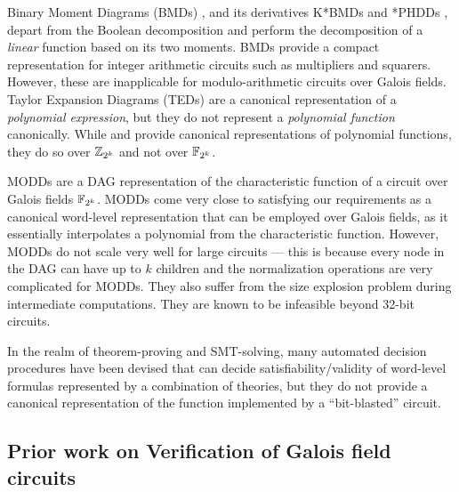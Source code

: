 Binary Moment Diagrams (BMDs) \cite{bmd}, and its derivatives K*BMDs
\cite{kbmd} and *PHDDs \cite{phdd}, depart from the Boolean
decomposition and perform the decomposition of a {\it linear} function
based on its two moments. BMDs provide a compact representation for
integer arithmetic circuits such as multipliers and squarers. However,
these are inapplicable for modulo-arithmetic circuits over Galois fields.
Taylor Expansion Diagrams (TEDs) \cite{ted_tcomp} are a
canonical representation of a {\it polynomial expression}, but they do
not represent a {\it polynomial function} canonically. 
While \cite{shekhar:phd}  and \cite{alizadeh:tcad2010} provide
canonical representations of polynomial functions, they do so over
${\mathbb{Z}}_{2^k}$ and not over ${\mathbb{F}}_{2^k}$.


MODDs \cite{modd} \cite{modd_tcomp} are a DAG representation of the
characteristic function of a circuit over Galois fields ${\mathbb{F}}_{2^k}$. MODDs
come very close to satisfying our requirements as a canonical
word-level representation that can be employed over Galois fields, as
it essentially interpolates a polynomial from the characteristic 
function. However, MODDs do not scale very well for large circuits ---
this is because every node in the DAG can have up to $k$ children and
the normalization operations are very complicated for MODDs. They also
suffer from the size explosion problem during intermediate
computations. They are known to be infeasible beyond
32-bit circuits.  

In the realm of theorem-proving and SMT-solving, many automated
decision procedures have been devised that can decide
satisfiability/validity of word-level formulas represented by a
combination of theories, but they do not provide a canonical
representation of the function implemented by a ``bit-blasted''
circuit. 

\subsection{Prior work on Verification of Galois field circuits}

